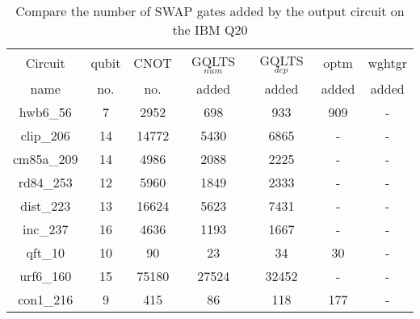 \documentclass[runningheads]{llncs}
\begin{document}
				\begin{table}[H]
					\label{tab5}
					\begin{center}  
					\begin{tabular}{|c|c|c|c|c|c|c|}
					\hline
					Circuit &  qubit  & CNOT &GQLTS$_{num}$& GQLTS$_{dep}$  & optm 	 & wghtgr 	\\
					 name	&   no. 	&	no. & added&  added &  added 	&  added\\
					\hline
					hwb6\_56 & 7 & 2952 & 698 & 933 & 909 & - \\ 
clip\_206 & 14 & 14772 & 5430 & 6865 & - & - \\ 
cm85a\_209 & 14 & 4986 & 2088 & 2225 & - & - \\ 
rd84\_253 & 12 & 5960 & 1849 & 2333 & - & - \\ 
dist\_223 & 13 & 16624 & 5623 & 7431 & - & - \\ 
inc\_237 & 16 & 4636 & 1193 & 1667 & - & - \\ 
qft\_10 & 10 & 90 & 23 & 34 & 30 & - \\ 
urf6\_160 & 15 & 75180 & 27524 & 32452 & - & - \\ 
con1\_216 & 9 & 415 & 86 & 118 & 177 & - \\ 
					\hline
					\end{tabular} 
					\end{center}	
					\caption{Compare the number of SWAP gates added by the 
					output circuit on the IBM Q20 }  
					\label{tab5}
					\end{table}
\end{document}
